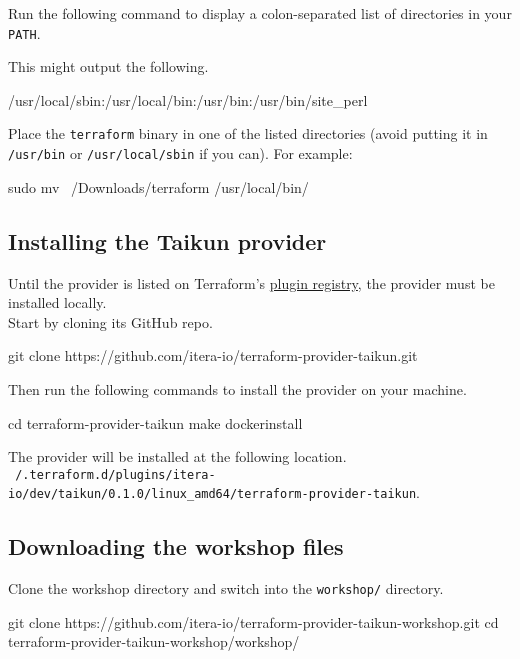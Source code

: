 Run the following command to display a colon-separated list of directories in your \texttt{PATH}.
This might output the following.
\begin{raw}
/usr/local/sbin:/usr/local/bin:/usr/bin:/usr/bin/site_perl
\end{raw}
Place the \texttt{terraform} binary in one of the listed directories (avoid putting it in \texttt{/usr/bin} or \texttt{/usr/local/sbin} if you can).
For example:
\begin{shell}
sudo mv ~/Downloads/terraform /usr/local/bin/
\end{shell}

\subsection{Installing the Taikun provider}
Until the provider is listed on Terraform's \href{https://registry.terraform.io/browse/providers}{plugin registry},
the provider must be installed locally.\\

Start by cloning its GitHub repo.
\begin{shell}
git clone https://github.com/itera-io/terraform-provider-taikun.git
\end{shell}
Then run the following commands to install the provider on your machine.
\begin{shell}
cd terraform-provider-taikun
make dockerinstall
\end{shell}
The provider will be installed at the following location.\\
\texttt{~/.terraform.d/plugins/itera-io/dev/taikun/0.1.0/linux\_amd64/terraform-provider-taikun}.

\subsection{Downloading the workshop files}
Clone the workshop directory and switch into the \texttt{workshop/} directory.
\begin{shell}
git clone https://github.com/itera-io/terraform-provider-taikun-workshop.git
cd terraform-provider-taikun-workshop/workshop/
\end{shell}
